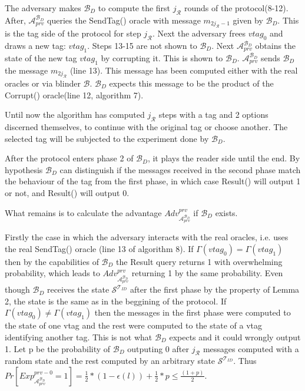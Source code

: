     The adversary makes $\mathcal{B}_D$ to compute the first $j_{\mathcal{R}}$ rounds of the protocol(8-12). After, $\mathcal{A}_{prv}^{\mathcal{B}_D}$ queries the 
    SendTag() oracle with message $m_{2j_{\mathcal{R}}-1}$ given by $\mathcal{B}_D$. This is the tag side of the protocol for step $j_{\mathcal{R}}$. Next the adversary
    frees $vtag_{0}$ and draws a new tag: $vtag_{1}$. Steps 13-15 are not shown to $\mathcal{B}_D$. Next $\mathcal{A}_{prv}^{\mathcal{B}_D}$ obtains the state of
    the new tag $vtag_{1}$ by corrupting it. This is shown to $\mathcal{B}_D$. $\mathcal{A}_{prv}^{\mathcal{B}_D}$ sends $\mathcal{B}_D$ the message $m_{2j_{\mathcal{R}}}$ 
    (line 13). This message has been computed either with the real oracles or via blinder $\mathcal{B}$. $\mathcal{B}_D$ expects this message to be the product of the Corrupt()
    oracle(line 12, algorithm 7).

    Until now the algorithm has computed $j_{\mathcal{R}}$ steps with a tag and 2 options discerned themselves, to continue with the original tag or choose another. The selected 
    tag will be subjected to the experiment done by $\mathcal{B}_D$. 

    After the protocol enters phase 2 of $\mathcal{B}_D$, it plays the reader side until the end. By hypothesis $\mathcal{B}_D$ can distinguish if the messages received in the second
    phase match the behaviour of the tag from the first phase, in which case Result() will output 1 or not, and Result() will output 0. 
    
    What remains is to calculate the advantage $Adv_{\mathcal{A}_{prv}^{\mathcal{B}_D}}^{prv}$ if $\mathcal{B}_D$ exists.

    Firstly the case in which the adversary interacts with the real oracles, i.e. uses the real SendTag() oracle (line 13 of algorithm 8). If
    $\Gamma(vtag_0) = \Gamma(vtag_1)$ then by the capabilities of $\mathcal{B}_D$ the Result query returns 1 with overwhelming probability, which
    leads to $Adv_{\mathcal{A}_{prv}^{\mathcal{B}_D}}^{prv}$ returning 1 by the same probability. Even though $\mathcal{B}_D$ receives the state
    $\mathcal{S}^{\mathcal{T}_{ID}}$ after the first phase by the property of Lemma 2, the state is the same as in the beggining of the protocol.
    If $\Gamma(vtag_0) \neq \Gamma(vtag_1)$ then the messages in the first phase were computed to the state of one vtag and the rest were computed
    to the state of a vtag identifying another tag. This is not what $\mathcal{B}_D$ expects and it could wrongly output 1. Let p be the probability
    of $\mathcal{B}_D$ outputing 0 after $j_\mathcal{R}$ messages computed with a random state and the rest computed by an arbitrary state 
    $\mathcal{S}^{\mathcal{T}_{ID}}$. Thus $Pr[Exp_{\mathcal{A}_{prv}^{\mathcal{B}_D}}^{prv-0} = 1] = \frac{1}{2}*(1-\epsilon(l))
    +\frac{1}{2}*p \leq \frac{(1+p)}{2}.$

